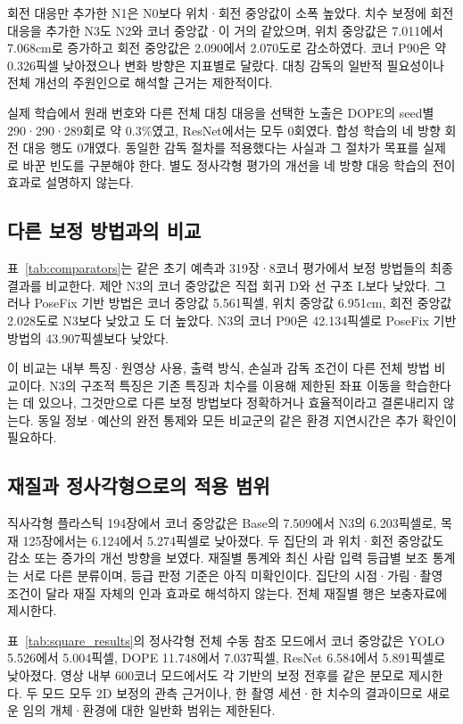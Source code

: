 회전 대응만 추가한 N1은 N0보다 위치·회전 중앙값이 소폭 높았다. 치수 보정에 회전 대응을 추가한 N3도 N2와 코너 중앙값·\pckten 이 거의 같았으며, 위치 중앙값은 7.011에서 7.068cm로 증가하고 회전 중앙값은 2.090에서 2.070도로 감소하였다. 코너 P90은 약 0.326픽셀 낮아졌으나 변화 방향은 지표별로 달랐다. 대칭 감독의 일반적 필요성이나 전체 개선의 주원인으로 해석할 근거는 제한적이다.

실제 학습에서 원래 번호와 다른 전체 대칭 대응을 선택한 노출은 DOPE의 seed별 290·290·289회로 약 0.3\%였고, ResNet에서는 모두 0회였다. 합성 학습의 네 방향 회전 대응 행도 0개였다. 동일한 감독 절차를 적용했다는 사실과 그 절차가 목표를 실제로 바꾼 빈도를 구분해야 한다. 별도 정사각형 평가의 개선을 네 방향 대응 학습의 전이 효과로 설명하지 않는다.

\subsection{다른 보정 방법과의 비교}
표~\ref{tab:comparators}는 같은 초기 예측과 319장·8코너 평가에서 보정 방법들의 최종 결과를 비교한다. 제안 N3의 코너 중앙값은 직접 회귀 D와 선 구조 L보다 낮았다. 그러나 PoseFix 기반 방법은 코너 중앙값 5.561픽셀, 위치 중앙값 6.951cm, 회전 중앙값 2.028도로 N3보다 낮았고 \pckten 도 더 높았다. N3의 코너 P90은 42.134픽셀로 PoseFix 기반 방법의 43.907픽셀보다 낮았다.


이 비교는 내부 특징·원영상 사용, 출력 방식, 손실과 감독 조건이 다른 전체 방법 비교이다. N3의 구조적 특징은 기존 특징과 치수를 이용해 제한된 좌표 이동을 학습한다는 데 있으나, 그것만으로 다른 보정 방법보다 정확하거나 효율적이라고 결론내리지 않는다. 동일 정보·예산의 완전 통제와 모든 비교군의 같은 환경 지연시간은 추가 확인이 필요하다.

\subsection{재질과 정사각형으로의 적용 범위}
직사각형 플라스틱 194장에서 코너 중앙값은 Base의 7.509에서 N3의 6.203픽셀로, 목재 125장에서는 6.124에서 5.274픽셀로 낮아졌다. 두 집단의 \pckten 과 위치·회전 중앙값도 감소 또는 증가의 개선 방향을 보였다. 재질별 통계와 최신 사람 입력 등급별 보조 통계는 서로 다른 분류이며, 등급 판정 기준은 아직 미확인이다. 집단의 시점·가림·촬영 조건이 달라 재질 자체의 인과 효과로 해석하지 않는다. 전체 재질별 행은 보충자료에 제시한다.

표~\ref{tab:square_results}의 정사각형 전체 수동 참조 모드에서 코너 중앙값은 YOLO 5.526에서 5.004픽셀, DOPE 11.748에서 7.037픽셀, ResNet 6.584에서 5.891픽셀로 낮아졌다. 영상 내부 600코너 모드에서도 각 기반의 보정 전후를 같은 분모로 제시한다. 두 모드 모두 2D 보정의 관측 근거이나, 한 촬영 세션·한 치수의 결과이므로 새로운 임의 개체·환경에 대한 일반화 범위는 제한된다.


